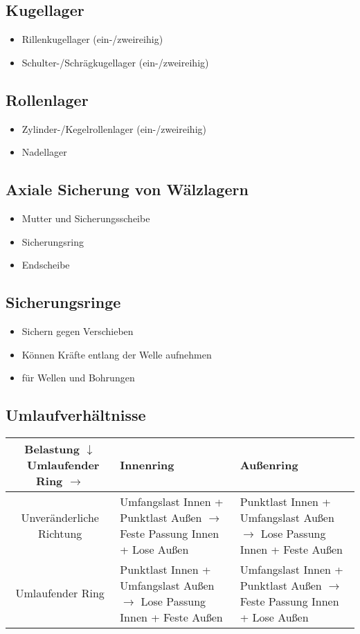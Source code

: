 \documentclass[a4paper,DIV=15,fontsize=11pt]{scrartcl}
\begin{document}
\subsection{Kugellager}
\begin{itemize}
	\item Rillenkugellager (ein-/zweireihig)
	\item Schulter-/Schrägkugellager (ein-/zweireihig)		
\end{itemize}
	
\subsection{Rollenlager}
\begin{itemize}
	\item Zylinder-/Kegelrollenlager (ein-/zweireihig)
	\item Nadellager		
\end{itemize}
	
\subsection{Axiale Sicherung von Wälzlagern}
\begin{itemize}
	\item Mutter und Sicherungsscheibe
	\item Sicherungsring
	\item Endscheibe
\end{itemize}
	
\subsection{Sicherungsringe}
\begin{itemize}
	\item Sichern gegen Verschieben
	\item Können Kräfte entlang der Welle aufnehmen
	\item für Wellen und Bohrungen 
\end{itemize}
	
\subsection{Umlaufverhältnisse}
\begin{tabular}{|c|p{5cm}|p{5cm}|}
	\hline
	Belastung $\downarrow$ \ Umlaufender Ring $\rightarrow$ & Innenring                                                                              & Außenring                                                                             \\
	\hline
	Unveränderliche Richtung                               & Umfangslast Innen + Punktlast Außen  $\rightarrow$  Feste Passung Innen + Lose Außen & Punktlast Innen + Umfangslast Außen  $\rightarrow$  Lose Passung Innen + Feste Außen \\
	\hline
	Umlaufender Ring                                        & Punktlast Innen + Umfangslast Außen  $\rightarrow$ Lose Passung Innen + Feste Außen  & Umfangslast Innen + Punktlast Außen  $\rightarrow$ Feste Passung Innen + Lose Außen  \\
	\hline
\end{tabular}
	
\end{document}
